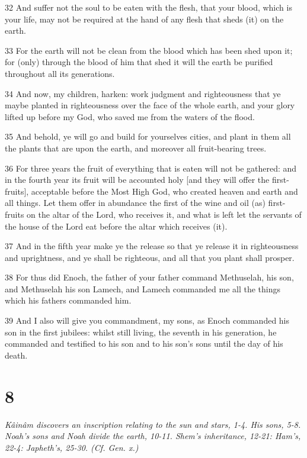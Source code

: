 \par 32 And suffer not the soul to be eaten with the flesh, that your blood, which is your life, may not be required at the hand of any flesh that sheds (it) on the earth.
\par 33 For the earth will not be clean from the blood which has been shed upon it; for (only) through the blood of him that shed it will the earth be purified throughout all its generations.
\par 34 And now, my children, harken: work judgment and righteousness that ye maybe planted in righteousness over the face of the whole earth, and your glory lifted up before my God, who saved me from the waters of the flood.
\par 35 And behold, ye will go and build for yourselves cities, and plant in them all the plants that are upon the earth, and moreover all fruit-bearing trees.
\par 36 For three years the fruit of everything that is eaten will not be gathered: and in the fourth year its fruit will be accounted holy [and they will offer the first-fruits], acceptable before the Most High God, who created heaven and earth and all things. Let them offer in abundance the first of the wine and oil (as) first-fruits on the altar of the Lord, who receives it, and what is left let the servants of the house of the Lord eat before the altar which receives (it).
\par 37 And in the fifth year make ye the release so that ye release it in righteousness and uprightness, and ye shall be righteous, and all that you plant shall prosper.
\par 38 For thus did Enoch, the father of your father command Methuselah, his son, and Methuselah his son Lamech, and Lamech commanded me all the things which his fathers commanded him.
\par 39 And I also will give you commandment, my sons, as Enoch commanded his son in the first jubilees: whilst still living, the seventh in his generation, he commanded and testified to his son and to his son's sons until the day of his death.

\chapter{8}

\par \textit{Kâinâm discovers an inscription relating to the sun and stars, 1-4. His sons, 5-8. Noah's sons and Noah divide the earth, 10-11. Shem's inheritance, 12-21: Ham's, 22-4: Japheth's, 25-30. (Cf. Gen. x.)}

